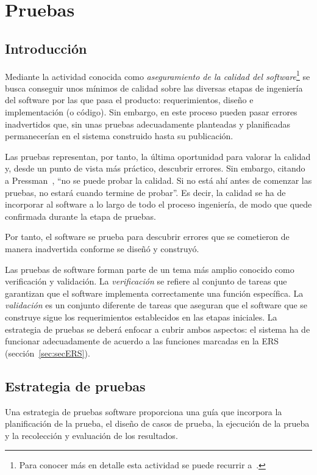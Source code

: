 \chapter{Pruebas}

\section{Introducción}

Mediante la actividad conocida como \emph{aseguramiento de la calidad del software}\footnote{Para conocer más en detalle esta actividad se puede recurrir a~\cite{Pre10}.} se busca conseguir unos mínimos de calidad sobre las diversas etapas de ingeniería del software por las que pasa el producto: requerimientos, diseño e implementación (o código). Sin embargo, en este proceso pueden pasar errores inadvertidos que, sin unas pruebas adecuadamente planteadas y planificadas permanecerían en el sistema construido hasta su publicación.

Las pruebas representan, por tanto, la última oportunidad para valorar la calidad y, desde un punto de vista más práctico, descubrir errores. Sin embargo, citando a Pressman~\cite{Pre10}, ``no se puede probar la calidad. Si no está ahí antes de comenzar las pruebas, no estará cuando termine de probar''. Es decir, la calidad se ha de incorporar al software a lo largo de todo el proceso ingeniería, de modo que quede confirmada durante la etapa de pruebas.

Por tanto, el software se prueba para descubrir errores que se cometieron de manera inadvertida conforme se diseñó y construyó.

Las pruebas de software forman parte de un tema más amplio conocido como verificación y validación. La \emph{verificación} se refiere al conjunto de tareas que garantizan que el software implementa correctamente una función específica. La \emph{validación} es un conjunto diferente de tareas que aseguran que el software que se construye sigue los requerimientos establecidos en las etapas iniciales. La estrategia de pruebas se deberá enfocar a cubrir ambos aspectos: el sistema ha de funcionar adecuadamente de acuerdo a las funciones marcadas en la ERS (sección~\ref{sec:secERS}).

\section{Estrategia de pruebas}

Una estrategia de pruebas software proporciona una guía que incorpora la planificación de la prueba, el diseño de casos de prueba, la ejecución de la prueba y la recolección y evaluación de los resultados.

